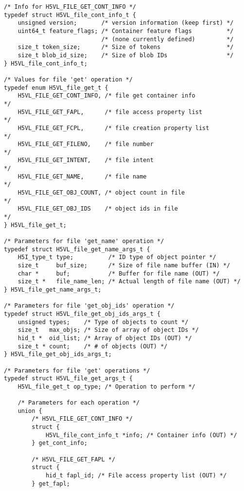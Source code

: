 \begin{lstlisting}
/* Info for H5VL_FILE_GET_CONT_INFO */
typedef struct H5VL_file_cont_info_t {
    unsigned version;       /* version information (keep first) */
    uint64_t feature_flags; /* Container feature flags          */
                            /* (none currently defined)         */
    size_t token_size;      /* Size of tokens                   */
    size_t blob_id_size;    /* Size of blob IDs                 */
} H5VL_file_cont_info_t;

/* Values for file 'get' operation */
typedef enum H5VL_file_get_t {
    H5VL_FILE_GET_CONT_INFO, /* file get container info              */
    H5VL_FILE_GET_FAPL,      /* file access property list            */
    H5VL_FILE_GET_FCPL,      /* file creation property list          */
    H5VL_FILE_GET_FILENO,    /* file number                          */
    H5VL_FILE_GET_INTENT,    /* file intent                          */
    H5VL_FILE_GET_NAME,      /* file name                            */
    H5VL_FILE_GET_OBJ_COUNT, /* object count in file                 */
    H5VL_FILE_GET_OBJ_IDS    /* object ids in file                   */
} H5VL_file_get_t;

/* Parameters for file 'get_name' operation */
typedef struct H5VL_file_get_name_args_t {
    H5I_type_t type;          /* ID type of object pointer */
    size_t     buf_size;      /* Size of file name buffer (IN) */
    char *     buf;           /* Buffer for file name (OUT) */
    size_t *   file_name_len; /* Actual length of file name (OUT) */
} H5VL_file_get_name_args_t;

/* Parameters for file 'get_obj_ids' operation */
typedef struct H5VL_file_get_obj_ids_args_t {
    unsigned types;    /* Type of objects to count */
    size_t   max_objs; /* Size of array of object IDs */
    hid_t *  oid_list; /* Array of object IDs (OUT) */
    size_t * count;    /* # of objects (OUT) */
} H5VL_file_get_obj_ids_args_t;

/* Parameters for file 'get' operations */
typedef struct H5VL_file_get_args_t {
    H5VL_file_get_t op_type; /* Operation to perform */

    /* Parameters for each operation */
    union {
        /* H5VL_FILE_GET_CONT_INFO */
        struct {
            H5VL_file_cont_info_t *info; /* Container info (OUT) */
        } get_cont_info;

        /* H5VL_FILE_GET_FAPL */
        struct {
            hid_t fapl_id; /* File access property list (OUT) */
        } get_fapl;


\end{lstlisting}
